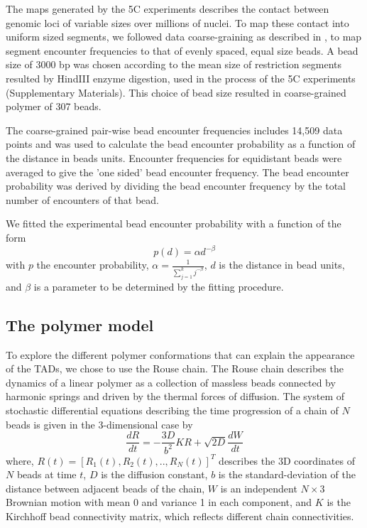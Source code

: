 \documentclass[12pt]{article}
\begin{document}
The maps generated by the 5C experiments describes the contact between genomic loci of variable sizes over millions of nuclei. To map these contact into uniform sized segments, we followed data coarse-graining as described in \cite{Giorgetti2014}, to map segment encounter frequencies to that of evenly spaced, equal size beads. A bead size of 3000 bp was chosen according to the mean size of restriction segments resulted by HindIII enzyme digestion, used in the process of the 5C experiments \cite{Nora2012} \cite{Giorgetti2014} (Supplementary Materials). This choice of bead size resulted in coarse-grained polymer of 307 beads.

The coarse-grained pair-wise bead encounter frequencies includes 14,509 data points and was used to calculate the bead encounter probability as a function of the distance in beads units. Encounter frequencies for equidistant beads were averaged to give the 'one sided' bead encounter frequency. The bead encounter probability was derived by dividing the bead encounter frequency by the total number of encounters of that bead.

We fitted the experimental bead encounter probability with a function of the form
\begin{equation}\label{equation_encounterProbabilityModel}
p(d)=\alpha d^{-\beta}
\end{equation}
with $p$ the encounter probability, $\alpha = \frac{1}{\sum_{j=1}^k j^{-\beta}}$, $d$ is the distance in bead units, and $\beta$ is a parameter to be determined by the fitting procedure.


\subsection{The polymer model}\label{subsection_thePolymerModel}
To explore the different polymer conformations that can explain the appearance of the TADs, we chose to use the Rouse chain. The Rouse chain describes the dynamics of a linear polymer as a collection of massless beads connected by harmonic springs and driven by the thermal forces of diffusion. The system of stochastic differential equations describing the time progression of a chain of $N$ beads is given in the 3-dimensional case by
\begin{equation}
\frac{dR}{dt}=-\frac{3D}{b^2}KR +\sqrt{2D}\frac{dW}{dt}
\end{equation}
where, $R(t)=[R_1(t),R_2(t),..,R_N(t)]^T$ describes the 3D coordinates of $N$ beads at time $t$, $D$ is the diffusion constant, $b$ is the standard-deviation of the distance between adjacent beads of the chain, $W$ is an independent $N\times3$ Brownian motion with mean 0 and variance 1 in each component, and $K$ is the Kirchhoff bead connectivity matrix, which reflects different chain connectivities.
\end{document}
